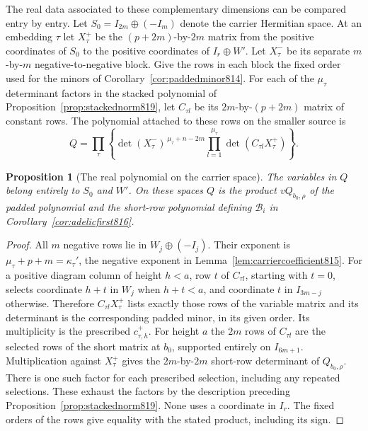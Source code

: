 \documentclass[a4paper,11pt]{article}
\newtheorem{proposition}{Proposition}[section]
\theoremstyle{definition}
\theoremstyle{remark}
\numberwithin{equation}{section}
\begin{document}
The real data associated to these complementary dimensions can
be compared entry by entry. Let \(S_0=I_{2m}\oplus(-I_m)\)
denote the carrier Hermitian space. At an embedding \(\tau\)
let \(X_\tau^+\) be the \((p+2m)\)-by-\(2m\) matrix from
the positive coordinates of \(S_0\) to the positive coordinates
of \(I_r\oplus W'\). Let \(X_\tau^-\) be its separate
\(m\)-by-\(m\) negative-to-negative block. Give the rows in
each block the fixed order used for the minors of
Corollary~\ref{cor:paddedminor814}. For each of the
\(\mu_\tau\) determinant factors in the stacked polynomial
of Proposition~\ref{prop:stackednorm819}, let \(C_{\tau l}\)
be its \(2m\)-by-\((p+2m)\) matrix of constant rows.
The polynomial attached to these rows on the smaller source is
\[
 Q=\prod_\tau\left\{
     \det(X_\tau^-)^{\,\mu_\tau+n-2m}
                 \prod_{l=1}^{\mu_\tau}\det(C_{\tau l}X_\tau^+)
                         \right\}.
\]

\begin{proposition}[The real polynomial on the carrier space]
\leavevmode\label{prop:carrierpolynomial825}
The variables in \(Q\) belong entirely to \(S_0\) and \(W'\).
On these spaces \(Q\) is the product \(vQ_{b_0,\rho}\) of the
padded polynomial and the short-row polynomial defining
\(\mathcal B_i\) in Corollary~\ref{cor:adelicfirst816}.
\end{proposition}
\begin{proof}
All \(m\) negative rows lie in \(W_j\oplus(-I_j)\). Their
exponent is \(\mu_\tau+p+m=\kappa_\tau'\), the negative
exponent in Lemma~\ref{lem:carriercoefficient815}.
For a positive diagram column of height \(h<a\), row \(t\)
of \(C_{\tau l}\), starting with \(t=0\), selects coordinate
\(h+t\) in \(W_j\) when \(h+t<a\), and coordinate \(t\) in
\(I_{3m-j}\) otherwise. Therefore \(C_{\tau l}X_\tau^+\)
lists exactly those rows of the variable matrix and its
determinant is the corresponding padded minor, in its given
order. Its multiplicity is the prescribed \(c^+_{\tau,h}\).
For height \(a\) the \(2m\) rows of \(C_{\tau l}\) are the
selected rows of the short matrix at \(b_0\), supported entirely
on \(I_{6m+1}\). Multiplication against \(X_\tau^+\)
gives the \(2m\)-by-\(2m\) short-row determinant of
\(Q_{b_0,\rho}\). There is one such factor for each prescribed
selection, including any repeated selections. These exhaust
the factors by the description preceding
Proposition~\ref{prop:stackednorm819}. None uses a coordinate
in \(I_r\). The fixed orders of the rows give equality with
the stated product, including its sign.
\end{proof}
\end{document}
